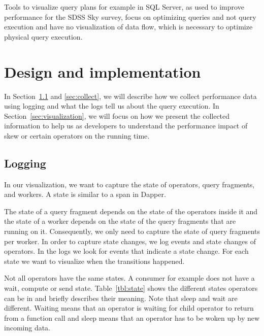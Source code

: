 \documentclass[11pt]{scrartcl}
\begin{document}
Tools to visualize query plans for example in SQL Server, as used to improve performance for the SDSS Sky survey\cite{szalay2002sdss}, focus on optimizing queries and not query execution and have no visualization of data flow, which is necessary to optimize physical query execution.


\section{Design and implementation}

In Section~\ref{sec:logging} and \ref{sec:collect}, we will describe how we collect performance data using logging and what the logs tell us about the query execution. In Section~\ref{sec:visualization}, we will focus on how we present the collected information to help us as developers to understand the performance impact of skew or certain operators on the running time.

\subsection{Logging}
\label{sec:logging}

In our visualization, we want to capture the state of operators, query fragments, and workers. A state is similar to a span in Dapper\cite{sigelman2010dapper}.

The state of a query fragment depends on the state of the operators inside it and the state of a worker depends on the state of the query fragments that are running on it. Consequently, we only need to capture the state of query fragments per worker. In order to capture state changes, we log events and state changes of operators. In the logs we look for events that indicate a state change. For each state we want to visualize when the transitions happened.

Not all operators have the same states. A consumer for example does not have a wait, compute or send state. Table~\ref{tbl:state} shows the different states operators can be in and briefly describes their meaning. Note that sleep and wait are different. Waiting means that an operator is waiting for child operator to return from a function call and sleep means that an operator has to be woken up by new incoming data.
\end{document}
